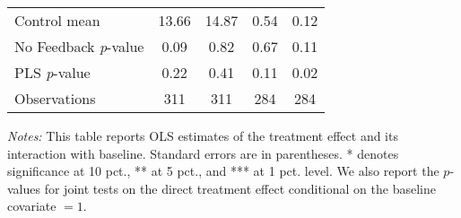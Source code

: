 \begin{table}[ht]
{\begin{threeparttable}
\begin{tabular}{l*{4}{c}}
Control mean    &    13.66         &    14.87         &     0.54         &     0.12         \\
No Feedback \emph{p}-value&     0.09         &     0.82         &     0.67         &     0.11         \\
PLS \emph{p}-value&     0.22         &     0.41         &     0.11         &     0.02         \\
Observations    &      311         &      311         &      284         &      284         \\
\bottomrule \end{tabular} \begin{tablenotes}[flushleft] \footnotesize \item \emph{Notes:} This table reports OLS estimates of the treatment effect and its interaction with baseline. Standard errors are in parentheses. * denotes significance at 10 pct., ** at 5 pct., and *** at 1 pct. level. We also report the \(p\)-values for joint tests on the direct treatment effect conditional on the baseline covariate $= 1$. \end{tablenotes} \end{threeparttable} } \end{table}

